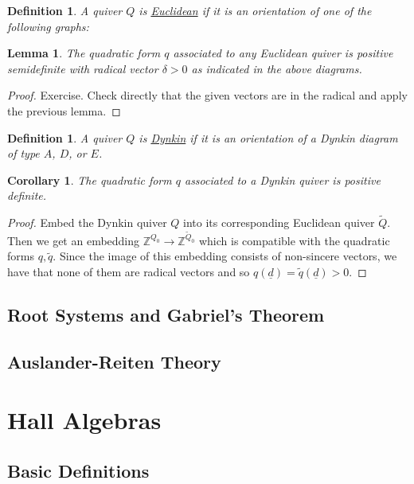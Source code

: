 \documentclass{book}
\newtheorem{lemma}[theorem]{Lemma}
\newtheorem{corollary}[theorem]{Corollary}
\newtheorem{definition}[theorem]{Definition}
\begin{document}
\begin{definition}
A quiver $Q$ is \underline{Euclidean} if it is an orientation of one of the following graphs:
\end{definition}

\begin{lemma}
The quadratic form $q$ associated to any Euclidean quiver is positive semidefinite with radical vector $\delta>0$ as indicated in the above diagrams.
\end{lemma}

\begin{proof}
Exercise. Check directly that the given vectors are in the radical and apply the previous lemma.
\end{proof}

\begin{definition}
A quiver $Q$ is \underline{Dynkin} if it is an orientation of a Dynkin diagram of type $A$, $D$, or $E$.
\end{definition}

\begin{corollary}
The quadratic form $q$ associated to a Dynkin quiver is positive definite.
\end{corollary}

\begin{proof}
Embed the Dynkin quiver $Q$ into its corresponding Euclidean quiver $\tilde{Q}$. Then we get an embedding $\mathbb{Z}^{Q_0}\to \mathbb{Z}^{\tilde{Q}_0}$ which is compatible with the quadratic forms $q, \tilde{q}$. Since the image of this embedding consists of non-sincere vectors, we have that none of them are radical vectors and so $q(\underline{d})=\tilde{q}(\underline{d})>0$.
\end{proof}



  \section{Root Systems and Gabriel's Theorem}

  \section{Auslander-Reiten Theory}


\chapter{Hall Algebras}

  \section{Basic Definitions}
  
\end{document}
